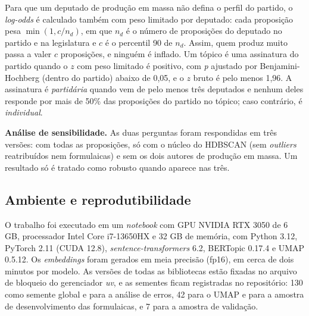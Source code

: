 Para que um deputado de produção em massa não defina o perfil do partido, o \textit{log-odds} é calculado também com peso limitado por deputado: cada proposição pesa $\min(1, c/n_d)$, em que $n_d$ é o número de proposições do deputado no partido e na legislatura e $c$ é o percentil 90 de $n_d$. Assim, quem produz muito passa a valer $c$ proposições, e ninguém é inflado. Um tópico é uma assinatura do partido quando o $z$ com peso limitado é positivo, com \textit{p} ajustado por Benjamini-Hochberg (dentro do partido) abaixo de 0,05, e o $z$ bruto é pelo menos 1,96. A assinatura é \textit{partidária} quando vem de pelo menos três deputados e nenhum deles responde por mais de 50\% das proposições do partido no tópico; caso contrário, é \textit{individual}.

\textbf{Análise de sensibilidade.} As duas perguntas foram respondidas em três versões: com todas as proposições, só com o núcleo do HDBSCAN (sem \textit{outliers} reatribuídos nem formulaicas) e sem os dois autores de produção em massa. Um resultado só é tratado como robusto quando aparece nas três.

\subsection{Ambiente e reprodutibilidade}
\label{subsec:ambiente}

O trabalho foi executado em um \textit{notebook} com GPU NVIDIA RTX 3050 de 6 GB, processador Intel Core i7-13650HX e 32 GB de memória, com Python 3.12, PyTorch 2.11 (CUDA 12.8), \textit{sentence-transformers} 6.2, BERTopic 0.17.4 e UMAP 0.5.12. Os \textit{embeddings} foram gerados em meia precisão (fp16), em cerca de dois minutos por modelo. As versões de todas as bibliotecas estão fixadas no arquivo de bloqueio do gerenciador \textit{uv}, e as sementes ficam registradas no repositório: 130 como semente global e para a análise de erros, 42 para o UMAP e para a amostra de desenvolvimento das formulaicas, e 7 para a amostra de validação.
